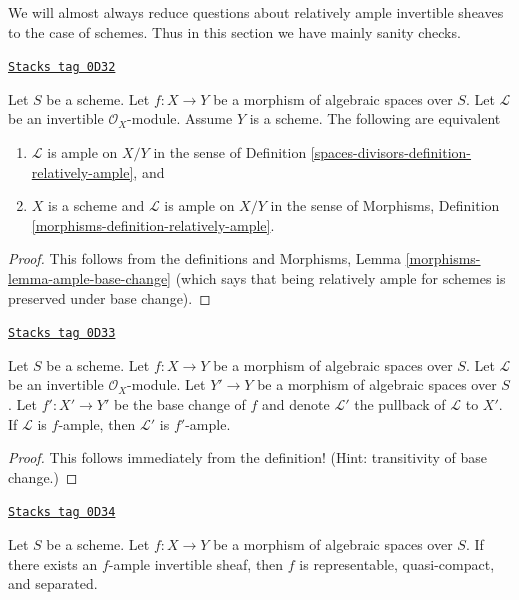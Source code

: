 We will almost always reduce questions about relatively ample invertible
sheaves to the case of schemes. Thus in this section we have
mainly sanity checks.

\begin{lemma}
\label{spaces-divisors-lemma-relatively-ample-sanity-check}
\href{https://stacks.math.columbia.edu/tag/0D32}{\texttt{Stacks tag 0D32}}

Let $S$ be a scheme.
Let $f : X \to Y$ be a morphism of algebraic spaces over $S$.
Let $\mathcal{L}$ be an invertible $\mathcal{O}_X$-module.
Assume $Y$ is a scheme. The following are equivalent
\begin{enumerate}
\item $\mathcal{L}$ is ample on $X/Y$ in the sense of
Definition \ref{spaces-divisors-definition-relatively-ample}, and
\item $X$ is a scheme and $\mathcal{L}$ is ample on $X/Y$
in the sense of
Morphisms, Definition \ref{morphisms-definition-relatively-ample}.
\end{enumerate}
\end{lemma}

\begin{proof}
This follows from the definitions and
Morphisms, Lemma \ref{morphisms-lemma-ample-base-change}
(which says that being relatively ample for schemes
is preserved under base change).
\end{proof}

\begin{lemma}
\label{spaces-divisors-lemma-ample-base-change}
\href{https://stacks.math.columbia.edu/tag/0D33}{\texttt{Stacks tag 0D33}}

Let $S$ be a scheme.
Let $f : X \to Y$ be a morphism of algebraic spaces over $S$.
Let $\mathcal{L}$ be an invertible $\mathcal{O}_X$-module.
Let $Y' \to Y$ be a morphism of algebraic spaces over $S$.
Let $f' : X' \to Y'$ be the base change of $f$ and denote
$\mathcal{L}'$ the pullback of $\mathcal{L}$ to $X'$.
If $\mathcal{L}$ is $f$-ample, then $\mathcal{L}'$ is $f'$-ample.
\end{lemma}

\begin{proof}
This follows immediately from the definition!
(Hint: transitivity of base change.)
\end{proof}

\begin{lemma}
\label{spaces-divisors-lemma-relatively-ample-properties}
\href{https://stacks.math.columbia.edu/tag/0D34}{\texttt{Stacks tag 0D34}}

Let $S$ be a scheme.
Let $f : X \to Y$ be a morphism of algebraic spaces over $S$.
If there exists an $f$-ample invertible sheaf, then
$f$ is representable, quasi-compact, and separated.
\end{lemma}

